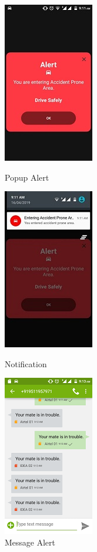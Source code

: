 \documentclass{article}
\begin{document}
\begin{flushleft}
\begin{figure}[!h]
\end{figure}
            \newpage
            \begin{figure}[!h]
	\centering
	\begin{minipage}[t]{4cm}
		\centering
		\includegraphics[scale=1]{message1.jpg}
		\caption{Popup Alert}
	\end{minipage}
	\hspace{3cm}
	\begin{minipage}[t]{4cm}
		\centering
		\includegraphics[scale=1]{message2.jpg}
		\caption{Notification}
	\end{minipage}
 
	\begin{minipage}[t]{4cm}
		\centering
		\includegraphics[scale=1]{message3.png}
		\caption{Message Alert}
	\end{minipage}
	

\end{figure}
\end{flushleft}
\end{document}
